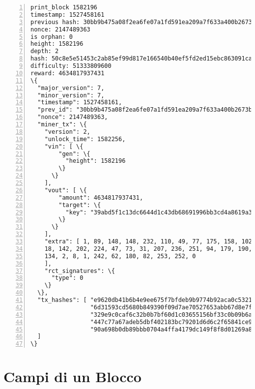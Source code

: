 \begin{appendices}
\begin{Verbatim}[commandchars=\\\{\}, numbers=left]
print_block 1582196
timestamp: 1527458161
previous hash: 30bb9b475a08f2ea6fe07a1fd591ea209a7f633a400b2673b8835a975348b0eb
nonce: 2147489363
is orphan: 0
height: 1582196
depth: 2
hash: 50c8e5e51453c2ab85ef99d817e166540b40ef5fd2ed15ebc863091ca2a04594
difficulty: 51333809600
reward: 4634817937431
\{
  "major_version": 7,
  "minor_version": 7,
  "timestamp": 1527458161,
  "prev_id": "30bb9b475a08f2ea6fe07a1fd591ea209a7f633a400b2673b8835a975348b0eb",
  "nonce": 2147489363,
  "miner_tx": \{
    "version": 2,
    "unlock_time": 1582256,
    "vin": [ \{
        "gen": \{
          "height": 1582196
        \}
      \}
    ],
    "vout": [ \{
        "amount": 4634817937431,
        "target": \{
          "key": "39abd5f1c13dc6644d1c43db68691996bb3cd4a8619a37a227667cf2bf055401"
        \}
      \}
    ],
    "extra": [ 1, 89, 148, 148, 232, 110, 49, 77, 175, 158, 102, 45, 72, 201, 193,
    18, 142, 202, 224, 47, 73, 31, 207, 236, 251, 94, 179, 190, 71, 72, 251, 110, 
    134, 2, 8, 1, 242, 62, 180, 82, 253, 252, 0
    ],
    "rct_signatures": \{
      "type": 0
    \}
  \},
  "tx_hashes": [ "e9620db41b6b4e9ee675f7bfdeb9b9774b92aca0c53219247b8f8c7aecf773ae",
                 "6d31593cd5680b849390f09d7ae70527653abb67d8e7fdca9e0154e5712591bf",
                 "329e9c0caf6c32b0b7bf60d1c03655156bf33c0b09b6a39889c2ff9a24e94a54",
                 "447c77a67adeb5dbf402183bc79201d6d6c2f65841ce95cf03621da5a6bffefc",
                 "90a698b0db89bbb0704a4ffa4179dc149f8f8d01269a85f46ccd7f0007167ee4"
  ]
\}
\end{Verbatim}


\section*{Campi di un Blocco}


\end{appendices}
